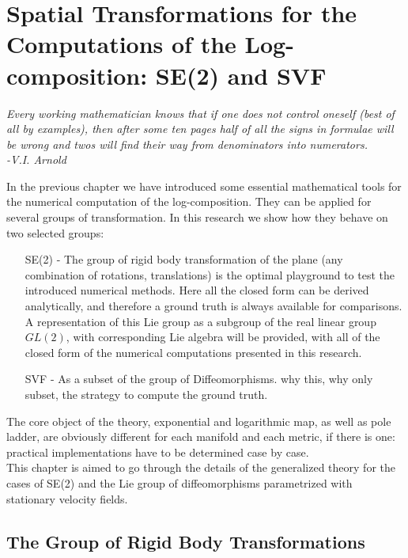 \chapter{Spatial Transformations for the Computations of the Log-composition: SE(2) and SVF}\label{ch:spatial_transformations}


\begin{flushright}
	\emph{Every working mathematician knows that if one does not control oneself (best of all by examples), then after some ten pages half of all the signs in formulae will be wrong and twos will find their way from denominators into numerators. \\ -V.I. Arnold}
\end{flushright}

In the previous chapter we have introduced some essential mathematical tools for the numerical computation of the log-composition. They can be applied for several groups of transformation. In this research we show how they behave on two selected groups:
\begin{enumerate}
	\item[SE(2) -] The group of rigid body transformation of the plane (any combination of rotations, translations) is the optimal playground to test the introduced numerical methods. Here all the closed form can be derived analytically, and therefore a ground truth is always available for comparisons. A representation of this Lie group as a subgroup of the real linear group $GL(2)$, with corresponding Lie algebra will be provided, with all of the closed form of the numerical computations presented in this research.
	\item[SVF -] As a subset of the group of Diffeomorphisms. why this, why only subset, the strategy to compute the ground truth.
\end{enumerate}

The core object of the theory, exponential and logarithmic map, as well as pole ladder, are obviously different for each manifold and each metric, if there is one: practical implementations have to be determined case by case.\\
This chapter is aimed to go through the details of the generalized theory for the cases of SE(2) and the Lie group of diffeomorphisms parametrized with stationary velocity fields.



\section{The Group of Rigid Body Transformations}\label{se:rigid_body_transformations}

